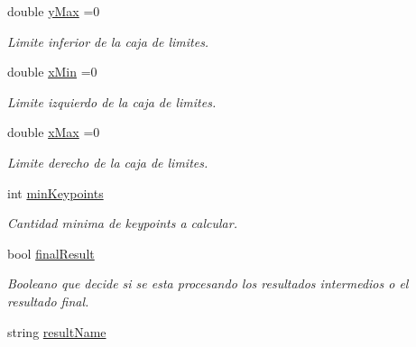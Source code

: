 \begin{DoxyCompactItemize}
double \mbox{\hyperlink{classuav_1_1Stitcher_ae5ef4cb4ade964a9ff73c8228db26f6a}{y\+Max}} =0
\begin{DoxyCompactList}\small\item\em Limite inferior de la caja de limites. \end{DoxyCompactList}\item 
\mbox{\label{classuav_1_1Stitcher_a26ca9f2ae4842f0d380f95d792c0c7ba}} 
double \mbox{\hyperlink{classuav_1_1Stitcher_a26ca9f2ae4842f0d380f95d792c0c7ba}{x\+Min}} =0
\begin{DoxyCompactList}\small\item\em Limite izquierdo de la caja de limites. \end{DoxyCompactList}\item 
\mbox{\label{classuav_1_1Stitcher_a20838e1362253194087dad4602a2fd94}} 
double \mbox{\hyperlink{classuav_1_1Stitcher_a20838e1362253194087dad4602a2fd94}{x\+Max}} =0
\begin{DoxyCompactList}\small\item\em Limite derecho de la caja de limites. \end{DoxyCompactList}\item 
\mbox{\label{classuav_1_1Stitcher_a3b54e9be9bda44c4a04b14a645bd9521}} 
int \mbox{\hyperlink{classuav_1_1Stitcher_a3b54e9be9bda44c4a04b14a645bd9521}{min\+Keypoints}}
\begin{DoxyCompactList}\small\item\em Cantidad minima de keypoints a calcular. \end{DoxyCompactList}\item 
\mbox{\label{classuav_1_1Stitcher_af9e17d1709ac39044b31555d75b9bb54}} 
bool \mbox{\hyperlink{classuav_1_1Stitcher_af9e17d1709ac39044b31555d75b9bb54}{final\+Result}}
\begin{DoxyCompactList}\small\item\em Booleano que decide si se esta procesando los resultados intermedios o el resultado final. \end{DoxyCompactList}\item 
\mbox{\label{classuav_1_1Stitcher_a910ff14cc80b37beb8598894c535d00f}} 
string \mbox{\hyperlink{classuav_1_1Stitcher_a910ff14cc80b37beb8598894c535d00f}{result\+Name}}

\end{DoxyCompactItemize}

